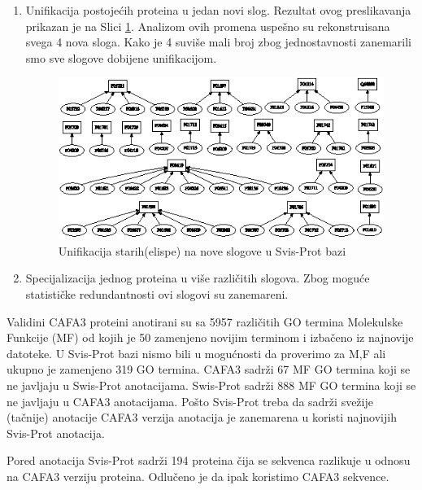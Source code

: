 \begin{enumerate}
  \item Unifikacija postojećih proteina u jedan novi slog. Rezultat ovog
    preslikavanja prikazan je na Slici \ref{fig:unifikacija_slogova}. Analizom
    ovih promena uspešno su rekonstruisana  svega 4 nova sloga. Kako je 4
    suviše mali broj zbog jednostavnosti zanemarili smo sve slogove dobijene
    unifikacijom.

  \begin{figure}[th]
  \centering
  \includegraphics[scale=2]{plots/unifikacija_slogova2.eps}
  \decoRule
  \caption{Unifikacija starih(elispe) na nove slogove u Svis-Prot bazi}
  \label{fig:unifikacija_slogova}
  \end{figure}

  \item Specijalizacija jednog proteina u više različitih slogova.  Zbog moguće
    statističke redundantnosti ovi slogovi su zanemareni.
\end{enumerate}





Validini CAFA3 proteini anotirani su sa  5957 različitih GO termina Molekulske
Funkcije (MF) od kojih je 50 zamenjeno novijim terminom i izbačeno iz najnovije
 datoteke. U Svis-Prot bazi nismo bili u mogućnosti da proverimo
za M,F ali ukupno je zamenjeno 319 GO termina.
CAFA3 sadrži 67 MF GO termina koji se ne javljaju u Swis-Prot anotacijama.
Swis-Prot sadrži 888 MF GO termina koji se ne javljaju u CAFA3 anotacijama.
Pošto Svis-Prot treba da sadrži svežije (tačnije) anotacije CAFA3 verzija
anotacija je zanemarena u koristi najnovijih Svis-Prot anotacija.

Pored anotacija Svis-Prot sadrži 194 proteina čija se sekvenca razlikuje u
odnosu na CAFA3 verziju proteina. Odlučeno je da ipak koristimo CAFA3 sekvence.


